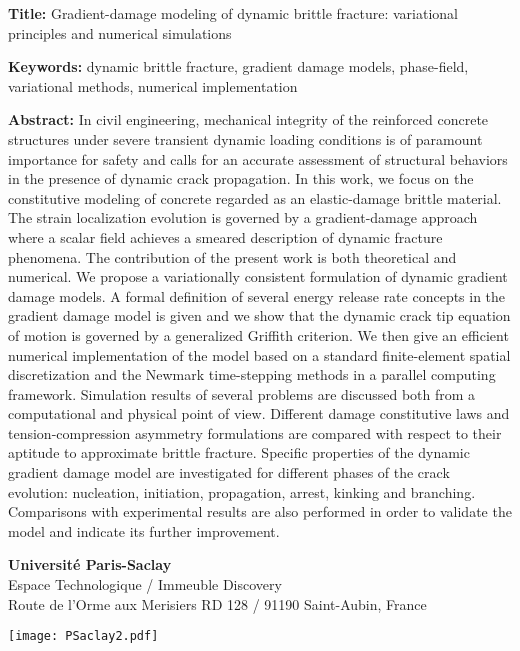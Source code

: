 \begin{flushleft}
\vspace{20pt}

\begin{mdframed}
\textbf{Title:} Gradient-damage modeling of dynamic brittle fracture: variational principles and numerical simulations

\textbf{Keywords:} dynamic brittle fracture, gradient damage models, phase-field, variational methods, numerical implementation

\textbf{Abstract:} In civil engineering, mechanical integrity of the reinforced concrete structures under severe transient dynamic loading conditions is of paramount importance for safety and calls for an accurate assessment of structural behaviors in the presence of dynamic crack propagation. In this work, we focus on the constitutive modeling of concrete regarded as an elastic-damage brittle material. The strain localization evolution is governed by a gradient-damage approach where a scalar field achieves a smeared description of dynamic fracture phenomena. The contribution of the present work is both theoretical and numerical. We propose a variationally consistent formulation of dynamic gradient damage models. A formal definition of several energy release rate concepts in the gradient damage model is given and we show that the dynamic crack tip equation of motion is governed by a generalized Griffith criterion. We then give an efficient numerical implementation of the model based on a standard finite-element spatial discretization and the Newmark time-stepping methods in a parallel computing framework. Simulation results of several problems are discussed both from a computational and physical point of view. Different damage constitutive laws and tension-compression asymmetry formulations are compared with respect to their aptitude to approximate brittle fracture. Specific properties of the dynamic gradient damage model are investigated for different phases of the crack evolution: nucleation, initiation, propagation, arrest, kinking and branching. Comparisons with experimental results are also performed in order to validate the model and indicate its further improvement.
\end{mdframed}
\end{flushleft}

\vfill

\begin{minipage}[b]{0.6\textwidth}
\small
\color{color02}
\textbf{Université Paris-Saclay} \\
Espace Technologique / Immeuble Discovery  \\
Route de l'Orme aux Merisiers RD 128 / 91190 Saint-Aubin, France
\end{minipage}
\hfill
\begin{minipage}[b]{0.35\textwidth}
\hfill
\texttt{[image: PSaclay2.pdf]}
\end{minipage}